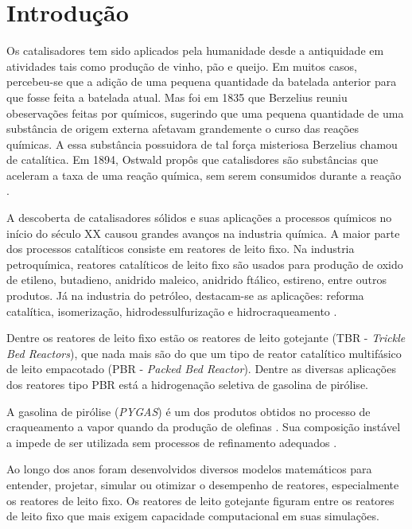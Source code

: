 %
% 
%
\chapter{Introdução} \label{chap:introduction}

Os catalisadores tem sido aplicados pela humanidade desde a antiquidade
em atividades tais como produção de vinho, pão e queijo. Em muitos
casos, percebeu-se que a adição de uma pequena quantidade da batelada anterior
para que fosse feita a batelada atual. Mas foi em 1835 que Berzelius reuniu
obeservações feitas por químicos, sugerindo que uma pequena quantidade de
uma substância de origem externa afetavam grandemente o
curso das reações químicas. A essa substância possuidora de tal força
misteriosa Berzelius chamou de catalítica. Em 1894, Ostwald propôs que
catalisdores são substâncias que aceleram a taxa de uma reação química, sem
serem consumidos durante a reação \cite{Oyama1988}.

A descoberta de catalisadores sólidos e suas aplicações a processos químicos no
início do século XX causou grandes avanços na industria química. A maior parte
dos processos catalíticos consiste em reatores de leito fixo. Na industria
petroquímica, reatores catalíticos de leito fixo são usados para produção de
oxido de etileno, butadieno, anidrido maleico, anidrido ftálico, estireno,
entre outros produtos. Já na industria do petróleo, destacam-se as aplicações:
reforma catalítica, isomerização, hidrodessulfurização e hidrocraqueamento
\cite{Froment2011}.

Dentre os reatores de leito fixo estão os reatores de leito gotejante
(TBR - \emph{Trickle Bed Reactors}), que nada mais são do que um tipo de reator
catalítico multifásico de leito empacotado (PBR - \emph{Packed Bed Reactor}).
Dentre as diversas aplicações dos reatores tipo PBR está a hidrogenação
seletiva de gasolina de pirólise.

A gasolina de pirólise (\emph{PYGAS}) é um dos produtos obtidos no processo de
craqueamento a vapor quando da produção de olefinas \cite{Cheng1986}. Sua
composição instável a impede de ser utilizada sem processos de refinamento
adequados \cite{Derrien1986}.

Ao longo dos anos foram desenvolvidos diversos modelos matemáticos para
entender, projetar, simular ou otimizar o desempenho de reatores, especialmente
os reatores de leito fixo. Os reatores de leito gotejante figuram entre os
reatores de leito fixo que mais exigem capacidade computacional em suas
simulações. 

